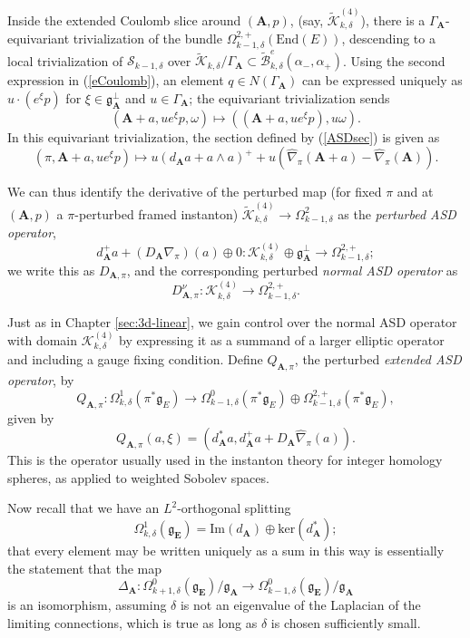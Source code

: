\documentclass{memo-l}
\theoremstyle{definition}
\theoremstyle{remark}
\numberwithin{section}{chapter}
\numberwithin{equation}{chapter}
\begin{document}
Inside the extended Coulomb slice around $(\mathbf{A},p)$, (say, $\widetilde {\mathcal K}^{(4)}_{k,\delta}$), there is a $\Gamma_\mathbf{A}$-equivariant trivialization of the bundle $\Omega^{2,+}_{k-1,\delta}(\text{End}(E))$, descending to a local trivialization of $\mathcal S_{k-1,\delta}$ over $\widetilde{\mathcal K}_{k,\delta}/\Gamma_\mathbf{A} \subset \widetilde{\mathcal B}^e_{k,\delta}(\alpha_-, \alpha_+)$. Using the second expression in (\ref{eCoulomb}), an element $q \in N(\Gamma_{\mathbf{A}})$ can be expressed uniquely as $u \cdot (e^{\xi}p)$ for $\xi \in \mathfrak g_\mathbf{A}^\perp$ and $u \in \Gamma_{\mathbf{A}}$; the equivariant trivialization sends 
$$(\mathbf{A}+a, u e^{\xi} p,\omega) \mapsto ((\mathbf{A}+a, u e^{\xi} p),  u \omega).$$
In this equivariant trivialization, the section defined by (\ref{ASDsec}) is given as 
$$(\pi, \mathbf{A}+a, u e^{\xi} p) \mapsto u\left(d_{\mathbf{A}}a + a \wedge a\right)^+ + u\left(\widehat \nabla_\pi(\mathbf{A}+a) - \widehat \nabla_\pi(\mathbf{A})\right).$$

We can thus identify the derivative of the perturbed map (for fixed $\pi$ and at $(\mathbf{A},p)$ a $\pi$-perturbed framed instanton) $\widetilde{\mathcal K}^{(4)}_{k,\delta} \to \Omega^2_{k-1,\delta}$ as the \textit{perturbed ASD operator}, $$d_{\mathbf{A}}^+a + (D_{\mathbf{A}}\nabla_{\pi})(a) \oplus 0: \mathcal K^{(4)}_{k,\delta} \oplus \mathfrak g_{\mathbf{A}}^\perp \to \Omega^{2,+}_{k-1,\delta};$$ we write this as $D_{\mathbf{A},\pi}$, and the corresponding perturbed \textit{normal ASD operator} as $$D^\nu_{\mathbf{A},\pi}: \mathcal K^{(4)}_{k,\delta} \to \Omega^{2,+}_{k-1,\delta}.$$ 

Just as in Chapter \ref{sec:3d-linear}, we gain control over the normal ASD operator with domain $\mathcal K^{(4)}_{k,\delta}$ by expressing it as a summand of a larger elliptic operator and including a gauge fixing condition. Define $Q_{\mathbf{A},\pi}$, the perturbed \textit{extended ASD operator}, by $$Q_{\mathbf{A},\pi}: \Omega^1_{k,\delta}(\pi^*\mathfrak g_E) \to \Omega^0_{k-1,\delta}(\pi^*\mathfrak g_E) \oplus \Omega^{2,+}_{k-1,\delta}(\pi^*\mathfrak g_E),$$ given by $$Q_{\mathbf{A},\pi}(a,\xi) = (d_{\mathbf{A}}^* a, d_{\mathbf{A}}^+ a + D_{\mathbf{A}}\widehat{\nabla}_\pi(a)).$$ This is the operator usually used in the instanton theory for integer homology spheres, as applied to weighted Sobolev spaces.

Now recall that we have an $L^2$-orthogonal splitting 
$$\Omega^1_{k,\delta}(\mathfrak g_{\mathbf{E}}) = \text{Im}(d_{\mathbf{A}}) \oplus \text{ker}(d_{\mathbf{A}}^*);$$
that every element may be written uniquely as a sum in this way is essentially the statement that the map $$\Delta_{\mathbf{A}}: \Omega^0_{k+1,\delta}(\mathfrak g_{\mathbf{E}})/\mathfrak g_{\mathbf{A}} \to \Omega^0_{k-1,\delta}(\mathfrak g_{\mathbf{E}})/\mathfrak g_{\mathbf{A}}$$ 
is an isomorphism, assuming $\delta$ is not an eigenvalue of the Laplacian of the limiting connections, which is true as long as $\delta$ is chosen sufficiently small.
\end{document}
